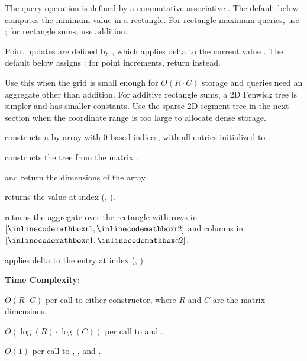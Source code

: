 The query operation is defined by a commutative associative . The default below computes the minimum value in a rectangle. For rectangle maximum queries, use ; for rectangle sums, use addition.

Point updates are defined by , which applies delta  to the current value . The default below assigns ; for point increments, return  instead.

Use this when the grid is small enough for $O(R \cdot C)$ storage and queries need an aggregate other than addition. For additive rectangle sums, a 2D Fenwick tree is simpler and has smaller constants. Use the sparse 2D segment tree in the next section when the coordinate range is too large to allocate dense storage.

\begin{compactitem}
  \item {} constructs a  by  array with 0-based indices, with all entries initialized to .
  \item {} constructs the tree from the matrix .
  \item {} and  return the dimensions of the array.
  \item {} returns the value at index (, ).
  \item {} returns the aggregate over the rectangle with rows in $[{\inlinecodemath{r1}}, {\inlinecodemath{r2}}]$ and columns in $[{\inlinecodemath{c1}}, {\inlinecodemath{c2}}]$.
  \item {} applies delta  to the entry at index (, ).
\end{compactitem}

\textbf{Time Complexity}:
\begin{compactitem}
  \item $O(R \cdot C)$ per call to either constructor, where $R$ and $C$ are the matrix dimensions.
  \item $O(\log\left(R\right) \cdot \log\left(C\right))$ per call to  and .
  \item $O(1)$ per call to , , and .
\end{compactitem}

